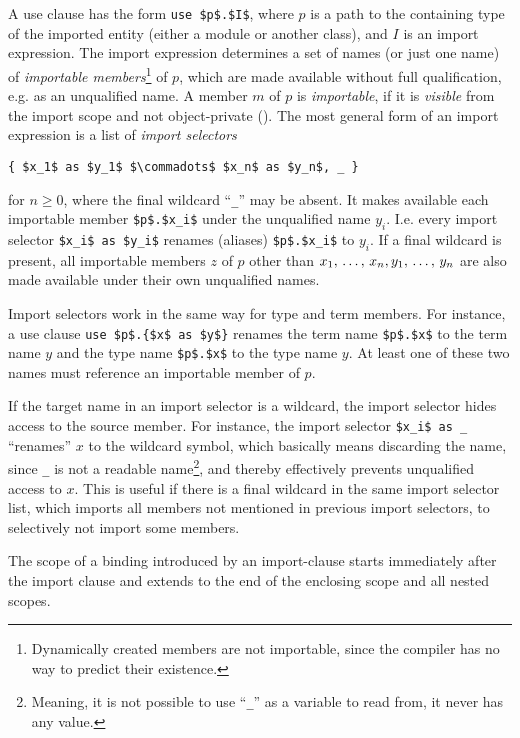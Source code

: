 A use clause has the form \lstinline!use $p$.$I$!, where $p$ is a path to the containing type of the imported entity (either a module or another class), and $I$ is an import expression. The import expression determines a set of names (or just one name) of {\em importable members}\footnote{Dynamically created members are not importable, since the compiler has no way to predict their existence.} of $p$, which are made available without full qualification, e.g. as an unqualified name. A member $m$ of $p$ is {\em importable}, if it is {\em visible} from the import scope and not object-private (). The most general form of an import expression is a list of {\em import selectors}
\begin{lstlisting}
{ $x_1$ as $y_1$ $\commadots$ $x_n$ as $y_n$, _ }
\end{lstlisting}
for $n \ge 0$, where the final wildcard ``\lstinline!_!'' may be absent. It makes available each importable member \lstinline!$p$.$x_i$! under the unqualified name $y_i$. I.e. every import selector \lstinline!$x_i$ as $y_i$! renames (aliases) \lstinline!$p$.$x_i$! to $y_i$. If a final wildcard is present, all importable members $z$ of $p$ other than $x_1 ,\, \ldots ,\, x_n, y_1 ,\, \ldots ,\, y_n$ are also made available under their own unqualified names. 

Import selectors work in the same way for type and term members. For instance, a use clause \lstinline!use $p$.{$x$ as $y$}! renames the term name \lstinline!$p$.$x$! to the term name $y$ and the type name \lstinline!$p$.$x$! to the type name $y$. At least one of these two names must reference an importable member of $p$. 

If the target name in an import selector is a wildcard, the import selector hides access to the source member. For instance, the import selector \lstinline!$x_i$ as _! ``renames'' $x$ to the wildcard symbol, which basically means discarding the name, since \lstinline!_! is not a readable name\footnote{Meaning, it is not possible to use ``\lstinline!_!'' as a variable to read from, it never has any value.}, and thereby effectively prevents unqualified access to $x$. This is useful if there is a final wildcard in the same import selector list, which imports all members not mentioned in previous import selectors, to selectively not import some members. 

The scope of a binding introduced by an import-clause starts immediately after the import clause and extends to the end of the enclosing scope and all nested scopes. 

